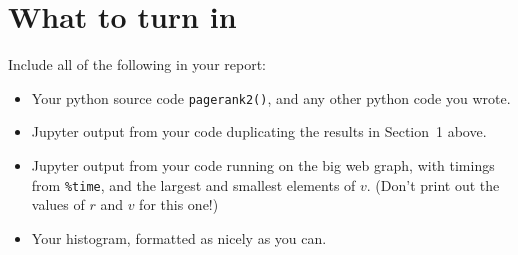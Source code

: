 \documentclass[11pt]{article}
\begin{document}
\section{What to turn in}

Include all of the following in your report:
\begin{itemize}
\item 
Your python source code {\tt pagerank2()}, 
and any other python code you wrote.
\item 
Jupyter output from your code duplicating the results in Section~1 above.
\item 
Jupyter output from your code running on the big web graph,
with timings from {\tt \%time}, and the largest and smallest
elements of $v$.
(Don't print out the values of $r$ and $v$ for this one!)
\item 
Your histogram, formatted as nicely as you can.
\end{itemize}
\end{document}
